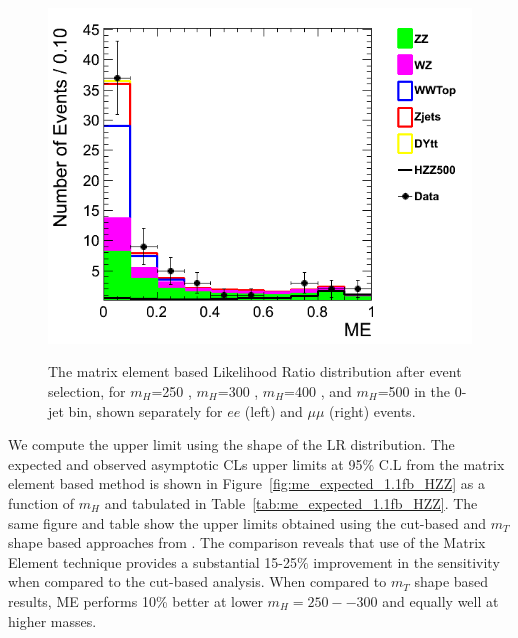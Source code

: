 \begin{figure}[!hbtp]
{\includegraphics[width=.40\textwidth]{figures/ME_mH500_mm_stack_lin.png}}\\                                                 
\caption{The matrix element based Likelihood Ratio distribution after event selection,                     
for $m_H$=250 \GeVcc {}, $m_H$=300 \GeVcc {}, $m_H$=400 \GeVcc 
{}, and $m_H$=500 \GeVcc {} in the 0-jet bin, shown separately for $ee$ (left)
and $\mu\mu$ (right) events.}                                            
\label{fig:lrstacksHZZ}                                                                                          
\end{figure}            

We compute the upper limit using the shape of the LR distribution. 
The expected and observed asymptotic CLs upper limits at 95\% C.L from the matrix element based method is shown in 
Figure~\ref{fig:me_expected_1.1fb_HZZ} as a function of $m_H$
and tabulated in Table~\ref{tab:me_expected_1.1fb_HZZ}.  The same figure and table show the upper limits obtained using 
the cut-based and $m_{T}$ shape based approaches from \cite{ref:HZZ2011smurf}. The comparison reveals that use of the Matrix Element 
technique provides a substantial 15-25$\%$ improvement in the sensitivity when compared to the cut-based analysis. When compared
to $m_{T}$ shape based results, ME performs 10\% better at lower $m_{H}=250--300$ \GeVcc and equally well at higher masses.

